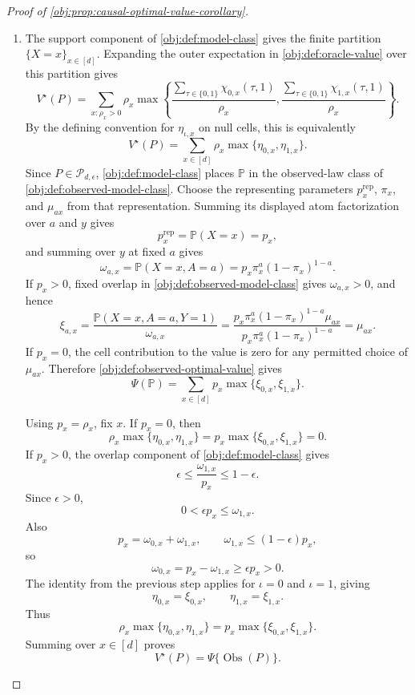 \begin{proof}[Proof of \cref{obj:prop:causal-optimal-value-corollary}]
\begin{enumerate}
\item The support component of \cref{obj:def:model-class} gives the finite partition \(\{X=x\}_{x\in[d]}\). Expanding the outer expectation in \cref{obj:def:oracle-value} over this partition gives
\[
V^\star(P)
=
\sum_{x:\rho_x>0}\rho_x
\max\left\{
\frac{\sum_{\tau\in\{0,1\}}\chi_{0,x}(\tau,1)}{\rho_x},
\frac{\sum_{\tau\in\{0,1\}}\chi_{1,x}(\tau,1)}{\rho_x}
\right\}.
\]
By the defining convention for \(\eta_{\iota,x}\) on null cells, this is equivalently
\[
V^\star(P)
=
\sum_{x\in[d]}\rho_x\max\{\eta_{0,x},\eta_{1,x}\}.
\]
Since \(P\in\mathcal P_{d,\epsilon}\), \cref{obj:def:model-class} places \(\mathbb P\) in the observed-law class of \cref{obj:def:observed-model-class}. Choose the representing parameters \(p_x^{\mathrm{rep}}\), \(\pi_x\), and \(\mu_{ax}\) from that representation. Summing its displayed atom factorization over \(a\) and \(y\) gives
\[
p_x^{\mathrm{rep}}=\mathbb P(X=x)=p_x,
\]
and summing over \(y\) at fixed \(a\) gives
\[
\omega_{a,x}
=
\mathbb P(X=x,A=a)
=
p_x\pi_x^a(1-\pi_x)^{1-a}.
\]
If \(p_x>0\), fixed overlap in \cref{obj:def:observed-model-class} gives \(\omega_{a,x}>0\), and hence
\[
\xi_{a,x}
=
\frac{\mathbb P(X=x,A=a,Y=1)}{\omega_{a,x}}
=
\frac{p_x\pi_x^a(1-\pi_x)^{1-a}\mu_{ax}}
{p_x\pi_x^a(1-\pi_x)^{1-a}}
=
\mu_{ax}.
\]
If \(p_x=0\), the cell contribution to the value is zero for any permitted choice of \(\mu_{ax}\). Therefore \cref{obj:def:observed-optimal-value} gives
\[
\Psi(\mathbb P)
=
\sum_{x\in[d]}p_x\max\{\xi_{0,x},\xi_{1,x}\}.
\]

Using \(p_x=\rho_x\), fix \(x\).  If \(p_x=0\), then
\[
\rho_x\max\{\eta_{0,x},\eta_{1,x}\}
=
p_x\max\{\xi_{0,x},\xi_{1,x}\}
=
0.
\]
If \(p_x>0\), the overlap component of \cref{obj:def:model-class} gives
\[
\epsilon\le \frac{\omega_{1,x}}{p_x}\le 1-\epsilon .
\]
Since \(\epsilon>0\),
\[
0<\epsilon p_x\le \omega_{1,x}.
\]
Also
\[
p_x=\omega_{0,x}+\omega_{1,x},
\qquad
\omega_{1,x}\le (1-\epsilon)p_x,
\]
so
\[
\omega_{0,x}=p_x-\omega_{1,x}\ge \epsilon p_x>0.
\]
The identity from the previous step applies for \(\iota=0\) and \(\iota=1\), giving
\[
\eta_{0,x}=\xi_{0,x},
\qquad
\eta_{1,x}=\xi_{1,x}.
\]
Thus
\[
\rho_x\max\{\eta_{0,x},\eta_{1,x}\}
=
p_x\max\{\xi_{0,x},\xi_{1,x}\}.
\]
Summing over \(x\in[d]\) proves
\[
V^\star(P)=\Psi\{\operatorname{Obs}(P)\}.
\]
\end{enumerate}
\end{proof}

